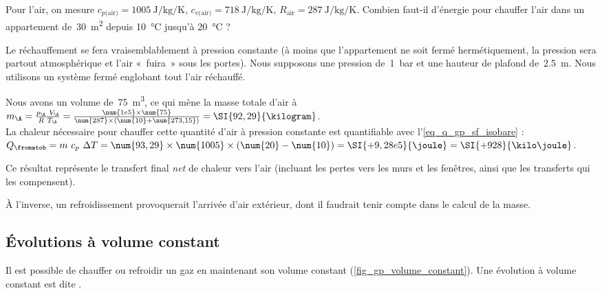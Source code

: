 		\begin{anexample}
			Pour l’air, on mesure $c_{p\text{(air)}} = \SI{1005}{\joule\per\kilogram\per\kelvin}$, $c_{v\text{(air)}} = \SI{718}{\joule\per\kilogram\per\kelvin}$, $R_\text{air} = \SI{287}{\joule\per\kilogram\per\kelvin}$.
			Combien faut-il d’énergie pour chauffer l’air dans un appartement de~\SI{30}{\metre\squared} depuis \SI{10}{\degreeCelsius} jusqu’à \SI{20}{\degreeCelsius} ?
				\begin{answer}
					Le réchauffement se fera vraisemblablement à pression constante (à moins que l’appartement ne soit fermé hermétiquement, la pression sera partout atmosphérique et l’air «~fuira~» sous les portes). Nous supposons une pression de~\SI{1}{\bar} et une hauteur de plafond de~\SI{2,5}{\metre}. Nous utilisons un système fermé englobant tout l’air réchauffé.
					
					Nous avons un volume de~\SI{75}{\metre\cubed}, ce qui mène la masse totale d’air à $m_\A = \frac{p_\A \ V_\A}{R \ T_\A} = \frac{\num{1e5} \times \num{75}}{\num{287} \times (\num{10} + \num{273,15})} = \SI{92,29}{\kilogram}$.\\
					La chaleur nécessaire pour chauffer cette quantité d’air à pression constante est quantifiable avec l’\cref{eq_q_gp_sf_isobare} : $Q_\fromatob = m \ c_p \ \Delta T = \num{93,29} \times \num{1005} \times (\num{20} - \num{10}) = \SI{+9,28e5}{\joule} = \SI{+928}{\kilo\joule}$.
				\end{answer}
					\begin{remark}Ce résultat représente le transfert final \emph{net} de chaleur vers l’air (incluant les pertes vers les murs et les fenêtres, ainsi que les transferts qui les compensent).\end{remark}
					\begin{remark}À l’inverse, un refroidissement provoquerait l’arrivée d’air extérieur, dont il faudrait tenir compte dans le calcul de la masse.\end{remark}
		\end{anexample}

	\onlyframabook{\clearpage}
	\subsection{Évolutions à volume constant}
	\label{ch_gp_isochores}

		Il est possible de chauffer ou refroidir un gaz en maintenant son volume constant (\cref{fig_gp_volume_constant}). Une évolution à volume constant est dite .
			
